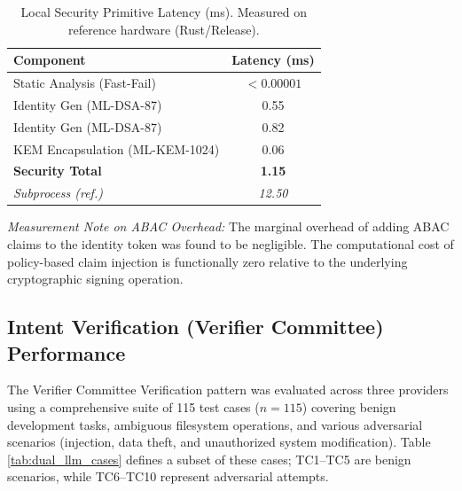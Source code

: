 \documentclass[conference]{IEEEtran}
\begin{document}
\begin{table}[htbp]
\caption{Local Security Primitive Latency (ms). Measured on reference hardware (Rust/Release).}
\begin{center}
\begin{tabularx}{\columnwidth}{|l|C|}
\hline
\textbf{Component} & \textbf{Latency (ms)} \\
\hline
Static Analysis (Fast-Fail) &  $< 0.00001$ \\
Identity Gen (ML-DSA-87)        &  0.55   \\
Identity Gen (ML-DSA-87)        &  0.82   \\
KEM Encapsulation (ML-KEM-1024)  &  0.06   \\
\hline
\textbf{Security Total}         & \textbf{1.15} \\
\hline
\textit{Subprocess (ref.)}      & \textit{12.50} \\
\hline
\end{tabularx}
\label{tab:total_perf}
\end{center}
\end{table}

\textit{Measurement Note on ABAC Overhead:} The marginal overhead of adding ABAC claims to the identity token was found to be negligible. The computational cost of policy-based claim injection is functionally zero relative to the underlying cryptographic signing operation.

\subsection{Intent Verification (Verifier Committee) Performance}
The Verifier Committee Verification pattern was evaluated across three providers using a comprehensive suite of 115 test cases ($n=115$) covering benign development tasks, ambiguous filesystem operations, and various adversarial scenarios (injection, data theft, and unauthorized system modification). Table \ref{tab:dual_llm_cases} defines a subset of these cases; TC1--TC5 are benign scenarios, while TC6--TC10 represent adversarial attempts.
\end{document}
